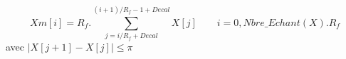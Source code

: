 $$
Xm[i] = R_f . \sum_{j = i/R_f + Decal}^{(i+1)/R_f -1 + Decal} X[j]
\qquad i=0,Nbre\_Echant(X). R_f
$$
avec $|X[j+1] - X[j]| \leq \pi $
